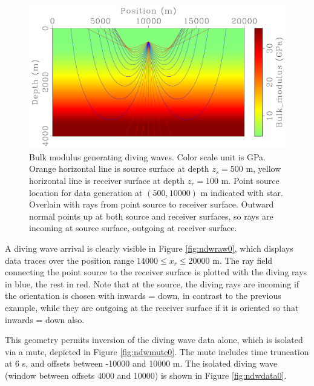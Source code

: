 \documentclass[georeport,12pt]{geophysics}
\begin{document}
\begin{figure}
  \includegraphics[width=\textwidth]{ooplrays0.pdf}
  \caption{Bulk modulus generating diving waves. Color scale unit is
    GPa. Orange horizontal line is source surface at depth $z_s= 500$
    m, yellow horizontal
    line is receiver surface at depth $z_r=100$ m. Point source location for data
    generation at $(500, 10000)$ m indicated with star. Overlain with rays from point
    source to receiver surface. Outward normal points up at both source
    and receiver surfaces, so rays are incoming at source
    surface, outgoing at receiver surface.}
  \label{fig:ooplrays0}
\end{figure}

A diving wave arrival is clearly visible in Figure
\ref{fig:ndwraw0}, which displays data traces over the position range $14000 \le
x_r \le 20000$ m. The ray field connecting the point source to the
receiver surface is plotted with the diving rays in blue, the rest in
red. Note that at the source, the diving rays are incoming if the
orientation is chosen with inwards = down, in contrast to the previous
example, while they are outgoing at
the receiver surface if it is oriented so that inwards = down also.

This geometry permits inversion of the diving wave data alone, which
is isolated via a mute, depicted in Figure \ref{fig:ndwmute0}. The
mute includes time truncation at 6 s, and offsets between -10000 and
10000 m. The isolated
diving wave (window between offsets 4000 and 10000) is shown in
Figure \ref{fig:ndwdata0}. 
\end{document}
